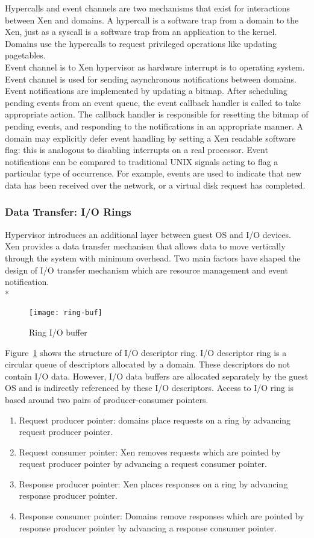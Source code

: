 Hypercalls and event channels are two mechanisms that exist for interactions between Xen and domains. A hypercall is a software trap from a domain to the Xen, just as a syscall is a software trap from an application to the kernel\cite{hypercall}. Domains use the hypercalls to request privileged operations like updating pagetables. 
\\
Event channel is to Xen hypervisor as hardware interrupt is to operating system. Event channel is used for sending asynchronous notifications between domains. Event notifications are implemented by updating a bitmap. After scheduling pending events from an event queue, the event callback handler is called to take appropriate action. The callback handler is responsible for resetting the bitmap of pending events, and responding to the notifications in an appropriate manner. A domain may explicitly defer event handling by setting a Xen readable software flag: this is analogous to disabling interrupts on a real processor. Event notifications can be compared to traditional UNIX signals acting to flag a particular type of occurrence. For example, events are used to indicate that new data has been received over the network, or a virtual disk request has completed. 

\subsubsection{Data Transfer: I/O Rings}

Hypervisor introduces an additional layer between guest OS and I/O devices. Xen provides a data transfer mechanism that allows data to move vertically through the system with minimum overhead. Two main factors have shaped the design of I/O transfer mechanism which are resource management and event notification. 
\\*
\begin{figure}[!ht]
\centering
\texttt{[image: ring-buf]}
\caption{Ring I/O buffer}
\label{fig:Ring buffer}
\end{figure}
Figure~\ref{fig:Ring buffer} shows the structure of I/O descriptor ring. I/O descriptor ring is a circular queue of descriptors allocated by a domain. These descriptors do not contain I/O data. However, I/O data buffers are allocated separately by the guest OS and is indirectly referenced by these I/O descriptors. Access to I/O ring is based around two pairs of producer-consumer pointers.

\begin{enumerate}
\item Request producer pointer: domains place requests on a ring by advancing request producer pointer. 
\item Request consumer pointer: Xen removes requests which are pointed by request producer pointer by advancing a request consumer pointer. 
\item Response producer pointer: Xen places responses on a ring by advancing response producer pointer. 
\item Response consumer pointer: Domains remove responses which are pointed by response producer pointer by advancing a response consumer pointer. 
\end{enumerate} 

